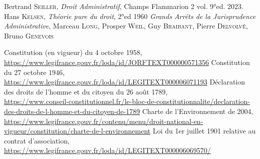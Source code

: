 \documentclass[math]{cours}
\begin{document}
\begin{thebibliography}{255}
	Bertrand \textsc{Seiller}, \textit{Droit Administratif}, Champs Flammarion 2 vol. 9°ed. 2023.
	Hans \textsc{Kelsen}, \textit{Théorie pure du droit}, 2°ed 1960
	\textit{Grands Arrêts de la Jurisprudence Administrative}, Marceau \textsc{Long}, Prosper \textsc{Weil}, Guy \textsc{Braibant}, Pierre \textsc{Delvolvé}, Bruno \textsc{Genevois}



	Constitution (en vigueur) du 4 octobre 1958,\\
	\url{https://www.legifrance.gouv.fr/loda/id/JORFTEXT000000571356}
	Constitution du 27 octobre 1946,\\
	\url{https://www.legifrance.gouv.fr/loda/id/LEGITEXT000006071193}
	Déclaration des droits de l'homme et du citoyen du 26 août 1789,\\
	\url{https://www.conseil-constitutionnel.fr/le-bloc-de-constitutionnalite/declaration-des-droits-de-l-homme-et-du-citoyen-de-1789}
	Charte de l'Environnement de 2004,\\
	\url{https://www.legifrance.gouv.fr/contenu/menu/droit-national-en-vigueur/constitution/charte-de-l-environnement}
	Loi du 1er juillet 1901 relative au contrat d'association,\\
	\url{https://www.legifrance.gouv.fr/loda/id/LEGITEXT000006069570/}




\end{thebibliography}
\end{document}
